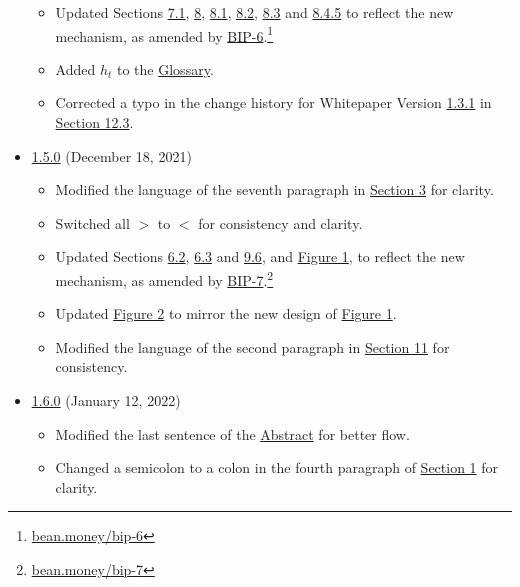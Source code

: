 \documentclass[class=article, crop=false]{standalone}
\begin{document}
\begin{itemize}[topsep=0pt, itemsep=3pt,leftmargin=16pt]
\begin{itemize}
        \item Updated Sections \hyperlink{subsection.7.1}{7.1}, \hyperlink{section.8}{8}, \hyperlink{subsection.8.1}{8.1}, \hyperlink{subsection.8.2}{8.2}, \hyperlink{subsection.8.3}{8.3} and \hyperlink{subsubsection.8.4.5}{8.4.5} to reflect the new  mechanism, as amended by \href{https://bean.money/bip-6}{BIP-6}.\footnote{\href{https://bean.money/bip-6}{bean.money/bip-6}}
        \item Added $h_t$ to the \hyperlink{subsection.14.11}{Glossary}. 
        \item Corrected a typo in the change history for Whitepaper Version \href{https://github.com/BeanstalkFarms/Beanstalk-Whitepaper/blob/master/version-history/beanstalk1_3_1.pdf}{1.3.1} in \hyperlink{subsection.12.3}{Section 12.3}.
    \end{itemize}
    \item \href{https://github.com/BeanstalkFarms/Beanstalk-Whitepaper/blob/master/version-history/beanstalk1_5_0.pdf}{1.5.0} (December 18, 2021)
    \begin{itemize}
        \item Modified the language of the seventh paragraph in \hyperlink{section.6.3}{Section 3} for clarity.
        \item Switched all $>$ to $<$ for consistency and clarity.
        \item Updated Sections \hyperlink{subsection.6.2}{6.2}, \hyperlink{subsection.6.3}{6.3} and \hyperlink{subsection.9.6}{9.6}, and \hyperref[fig 1]{Figure 1}, to reflect the new  mechanism, as amended by \href{https://bean.money/bip-7}{BIP-7}.\footnote{\href{https://bean.money/bip-7}{bean.money/bip-7}}
        \item Updated \hyperref[fig 2]{Figure 2} to mirror the new design of \hyperref[fig 1]{Figure 1}. 
        \item Modified the language of the second paragraph in \hyperlink{section.11}{Section 11} for consistency.
    \end{itemize}
    \item \href{https://github.com/BeanstalkFarms/Beanstalk-Whitepaper/blob/master/version-history/beanstalk1_6_0.pdf}{1.6.0} (January 12, 2022)
    \begin{itemize}
        \item Modified the last sentence of the \hyperlink{abstract}{Abstract} for better flow.
        \item Changed a semicolon to a colon in the fourth paragraph of \hyperlink{section.1}{Section 1} for clarity.

\end{itemize}
\end{itemize}
\end{document}
